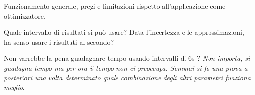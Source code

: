 
Funzionamento generale, pregi e limitazioni rispetto all'applicazione come ottimizzatore.




Quale intervallo di risultati si può usare? Data l'incertezza e le approssimazioni, ha senso usare i risultati al secondo?

Non varrebbe la pena guadagnare tempo usando intervalli di 6s ?
\emph{Non importa, si guadagna tempo ma per ora il tempo non ci preoccupa. Semmai si fa una prova a posteriori una volta determinato quale combinazione degli altri parametri funziona meglio}.





